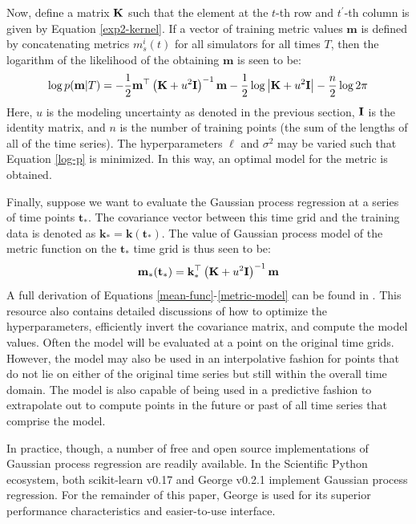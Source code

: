 Now, define a matrix $\mathbf{K}$ such that the element at the $t$-th row and $t^\prime$-th
column is given by Equation \ref{exp2-kernel}. If a vector of training metric 
values $\mathbf{m}$ is defined by concatenating metrics $m_s^i(t)$ for all 
simulators
for all times $T$, then the logarithm of the likelihood of the obtaining 
$\mathbf{m}$ is seen to be:
\begin{equation}
\label{log-p}
\log p(\mathbf{m}|T) = -\frac{1}{2}\mathbf{m}^\top\left(\mathbf{K} + u^2\mathbf{I}\right)^{-1}\mathbf{m}
                       -\frac{1}{2}\log\left|\mathbf{K} + u^2\mathbf{I}\right|
                       -\frac{n}{2}\log 2\pi
\end{equation}
Here, $u$ is the modeling uncertainty as denoted in the previous section, 
$\mathbf{I}$ is the identity matrix, and $n$ is the number of training points (the 
sum of the lengths of all of the time series). The hyperparameters $\ell$ and
$\sigma^2$ may be varied such that Equation \ref{log-p} is minimized. 
In this way, an optimal model for the metric is obtained.

Finally, suppose we want to evaluate the Gaussian process regression at a 
series of time points $\mathbf{t_*}$. 
The covariance vector between this time grid and the training data is denoted
as $\mathbf{k}_* = \mathbf{k}(\mathbf{t_*})$. The value of Gaussian process 
model of the metric function on the $\mathbf{t_*}$ time grid is thus seen to be:
\begin{equation}
\label{metric-model}
\mathbf{m}_*(\mathbf{t}_*) = \mathbf{k}_*^\top \left(\mathbf{K} + u^2\mathbf{I}\right)^{-1}\mathbf{m}
\end{equation}
A full derivation of Equations \ref{mean-func}-\ref{metric-model} can be found in 
\cite{rasmussen2006gaussian}. This resource also contains detailed discussions of 
how to optimize the hyperparameters, efficiently invert the covariance 
matrix, and compute the model values. Often the model will be evaluated at 
a point on the original time grids. However, the model may also be used in an
interpolative fashion for points that do not lie on either of the original
time series but still within the overall time domain. The model is also capable
of being used in a predictive fashion to extrapolate out to compute points in 
the future or past of all time series that comprise the model.

In practice, though, a number of free and open source implementations of Gaussian 
process regression are readily available. In the Scientific Python ecosystem, both 
scikit-learn v0.17 \cite{scikit-learn} and George v0.2.1 \cite{hodlr} implement 
Gaussian process regression. For the remainder of this paper, George is used
for its superior performance characteristics and easier-to-use interface.


